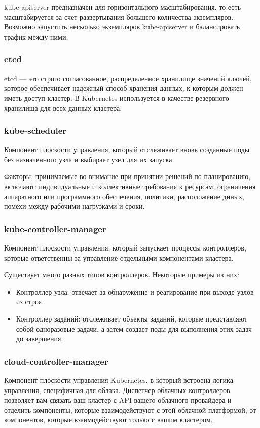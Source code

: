 \documentclass[a4page]{article}
\begin{document}
kube-apiserver предназначен для горизонтального масштабирования, то есть масштабируется за счет развертывания большего количества экземпляров. Возможно запустить несколько экземпляров kube-apiserver и балансировать трафик между ними.

\subsubsection{etcd}
etcd — это строго согласованное, распределенное хранилище значений ключей, которое обеспечивает надежный способ хранения данных, к которым должен иметь доступ кластер. В Kubernetes используется в качестве резервного хранилища для всех данных кластера.

\subsubsection{kube-scheduler}
Компонент плоскости управления, который отслеживает вновь созданные поды без назначенного узла и выбирает узел для их запуска.

Факторы, принимаемые во внимание при принятии решений по планированию, включают: индивидуальные и коллективные требования к ресурсам, ограничения аппаратного или программного обеспечения, политики, расположение днных, помехи между рабочими нагрузками и сроки.

\subsubsection{kube-controller-manager}
Компонент плоскости управления, который запускает процессы контроллеров, которые ответственны за управление отдельными компонентами кластера.

Существует много разных типов контроллеров. Некоторые примеры из них:
\begin{itemize}
   \item Контроллер узла: отвечает за обнаружение и реагирование при выходе узлов из строя.
   \item Контроллер заданий: отслеживает объекты заданий, которые представляют собой одноразовые задачи, а затем создает поды для выполнения этих задач до завершения.
\end{itemize}

\subsubsection{cloud-controller-manager}
Компонент плоскости управления Kubernetes, в который встроена логика \\управления, специфичная для облака. Диспетчер облачных контроллеров позволяет вам связать ваш кластер с API вашего облачного провайдера и отделить компоненты, которые взаимодействуют с этой облачной платформой, от компонентов, которые взаимодействуют только с вашим кластером.
\end{document}
